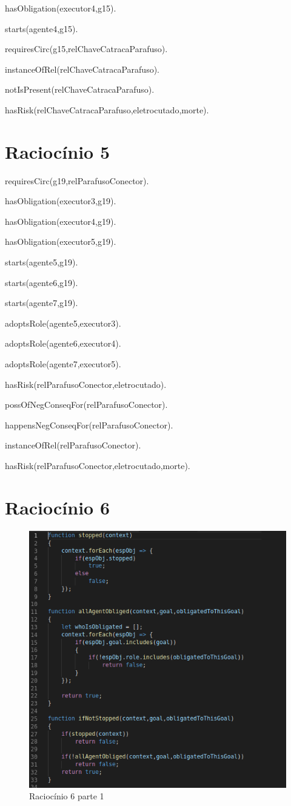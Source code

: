 hasObligation(executor4,g15).	

starts(agente4,g15).

requiresCirc(g15,relChaveCatracaParafuso).

instanceOfRel(relChaveCatracaParafuso).	

notIsPresent(relChaveCatracaParafuso).

hasRisk(relChaveCatracaParafuso,eletrocutado,morte).

\section{Raciocínio 5}

requiresCirc(g19,relParafusoConector).

hasObligation(executor3,g19).

hasObligation(executor4,g19).

hasObligation(executor5,g19).

starts(agente5,g19).

starts(agente6,g19).

starts(agente7,g19).

adoptsRole(agente5,executor3).

adoptsRole(agente6,executor4).

adoptsRole(agente7,executor5).

hasRisk(relParafusoConector,eletrocutado).

possOfNegConseqFor(relParafusoConector).

happensNegConseqFor(relParafusoConector).

instanceOfRel(relParafusoConector).

hasRisk(relParafusoConector,eletrocutado,morte).

\section{Raciocínio 6}


\begin{figure}[H]
  \centering
  \includegraphics[width=0.8\linewidth]{figure/algjs} 
  \caption{Raciocínio 6 parte 1}
  \label{atividiagram2}
\end{figure}


